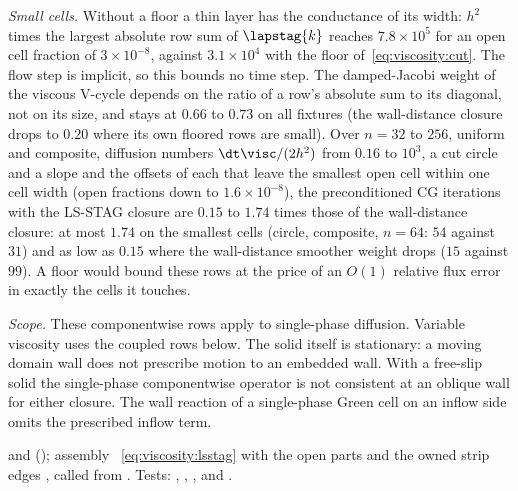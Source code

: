 \emph{Small cells.} Without a floor a thin layer has the conductance of its
width: $h^2$ times the largest absolute row sum of $\lapstag{k}$ reaches
$7.8\times10^{5}$ for an open cell fraction of $3\times10^{-8}$, against
$3.1\times10^{4}$ with the floor of~\cref{eq:viscosity:cut}. The flow step is
implicit, so this bounds no time step. The damped-Jacobi weight of the
viscous V-cycle depends on the ratio of a row's absolute sum to its diagonal,
not on its size, and stays at $0.66$ to $0.73$ on all fixtures (the wall-distance
closure drops to $0.20$ where its own floored rows are small). Over
$n=32$ to $256$, uniform and composite, diffusion numbers $\dt\visc/(2h^2)$
from $0.16$ to $10^3$, a cut circle and a slope and the offsets of each that
leave the smallest open cell within one cell width (open fractions down to
$1.6\times10^{-8}$), the preconditioned CG iterations with the LS-STAG closure
are $0.15$ to $1.74$ times those of the wall-distance closure: at most $1.74$ on the
smallest cells (circle, composite, $n=64$: $54$ against $31$) and as low as
$0.15$ where the wall-distance smoother weight drops ($15$ against $99$). A floor
would bound these rows at the price of an $O(1)$ relative flux error in
exactly the cells it touches.

\emph{Scope.} These componentwise rows apply to single-phase diffusion.
Variable viscosity uses the coupled rows below. The solid itself is
stationary: a moving domain wall does not prescribe motion to an embedded
wall. With a free-slip solid the single-phase componentwise operator is not
consistent at an oblique wall for either closure. The wall reaction of a
single-phase Green cell on an inflow side omits the prescribed inflow term.

\begin{implnote}
 and 
();
assembly ~\cref{eq:viscosity:lsstag}
with the open parts  and
the owned strip edges ,
called from .
Tests:
,
,
,
and .
\end{implnote}

